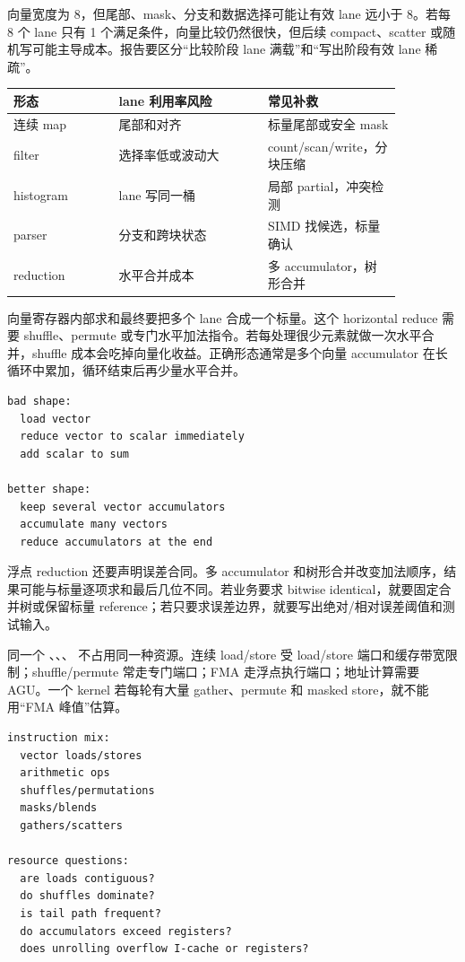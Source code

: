 向量宽度为 8，但尾部、mask、分支和数据选择可能让有效 lane 远小于 8。若每 8 个 lane 只有 1 个满足条件，向量比较仍然很快，但后续 compact、scatter 或随机写可能主导成本。报告要区分“比较阶段 lane 满载”和“写出阶段有效 lane 稀疏”。

\begin{center}
\begin{tabular}{p{0.24\linewidth}p{0.34\linewidth}p{0.28\linewidth}}
\toprule
形态 & lane 利用率风险 & 常见补救 \\
\midrule
连续 map & 尾部和对齐 & 标量尾部或安全 mask \\
filter & 选择率低或波动大 & count/scan/write，分块压缩 \\
histogram & lane 写同一桶 & 局部 partial，冲突检测 \\
parser & 分支和跨块状态 & SIMD 找候选，标量确认 \\
reduction & 水平合并成本 & 多 accumulator，树形合并 \\
\bottomrule
\end{tabular}
\end{center}

向量寄存器内部求和最终要把多个 lane 合成一个标量。这个 horizontal reduce 需要 shuffle、permute 或专门水平加法指令。若每处理很少元素就做一次水平合并，shuffle 成本会吃掉向量化收益。正确形态通常是多个向量 accumulator 在长循环中累加，循环结束后再少量水平合并。

\begin{lstlisting}[numbers=none,caption={reduction 的成本边界}]
bad shape:
  load vector
  reduce vector to scalar immediately
  add scalar to sum

better shape:
  keep several vector accumulators
  accumulate many vectors
  reduce accumulators at the end
\end{lstlisting}

浮点 reduction 还要声明误差合同。多 accumulator 和树形合并改变加法顺序，结果可能与标量逐项求和最后几位不同。若业务要求 bitwise identical，就要固定合并树或保留标量 reference；若只要求误差边界，就要写出绝对/相对误差阈值和测试输入。

同一个 、、、 不占用同一种资源。连续 load/store 受 load/store 端口和缓存带宽限制；shuffle/permute 常走专门端口；FMA 走浮点执行端口；地址计算需要 AGU。一个 kernel 若每轮有大量 gather、permute 和 masked store，就不能用“FMA 峰值”估算。

\begin{lstlisting}[numbers=none,caption={SIMD 报告必须写的资源问题}]
instruction mix:
  vector loads/stores
  arithmetic ops
  shuffles/permutations
  masks/blends
  gathers/scatters

resource questions:
  are loads contiguous?
  do shuffles dominate?
  is tail path frequent?
  do accumulators exceed registers?
  does unrolling overflow I-cache or registers?
\end{lstlisting}

